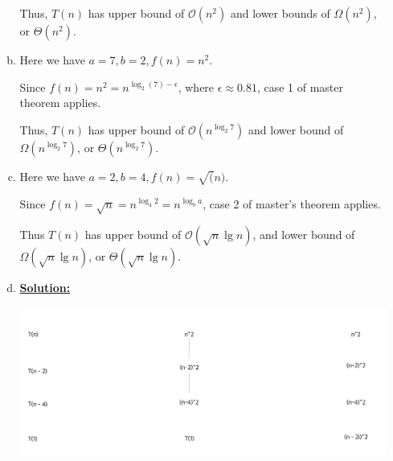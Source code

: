 \documentclass[12pt]{article}
\begin{document}
\begin{enumerate}[1.]
\begin{enumerate}[a)]
        \bigskip

        Thus, $T(n)$ has upper bound of $\mathcal{O}(n^2)$ and lower bounds of $\Omega(n^2)$, or $\Theta(n^2)$.

        \bigskip

        \item

        Here we have $a = 7, b = 2, f(n) = n^2$.

        \bigskip

        Since $f(n) = n^2 = n^{\log_2 (7) - \epsilon}$, where $\epsilon \approx 0.81$,
        case 1 of master theorem applies.

        \bigskip

        Thus, $T(n)$ has upper bound of $\mathcal{O}(n^{\log_2 7})$ and lower bound of $\Omega(n^{\log_2 7})$, or $\Theta(n^{\log_2 7})$.

        \bigskip

        \item

        Here we have $a = 2, b = 4 , f(n) = \sqrt(n)$.

        \bigskip

        Since $f(n) = \sqrt{n} = n^{\log_4 2} = n^{\log_b a}$, case 2 of master's theorem
        applies.

        \bigskip

        Thus $T(n)$ has upper bound of $\mathcal{O}(\sqrt{n}\lg n)$, and lower bound of
        $\Omega(\sqrt{n}\lg n)$, or $\Theta(\sqrt{n} \lg n)$.

        \item \underline{\textbf{Solution:}}

        \begin{center}
        \includegraphics[width=\linewidth]{images/worksheet_0_solution_11.png}
        \end{center}


    \end{enumerate}


\end{enumerate}
\end{document}
